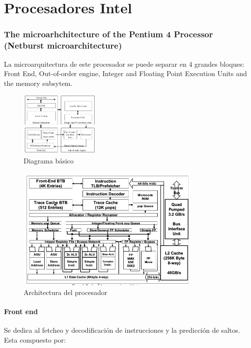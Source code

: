 \part{Procesadores Intel}
\section{The microarhchitecture of the Pentium 4 Processor (Netburst microarchitecture)}

La microarquitectura de este procesador se puede separar en 4 grandes bloques: Front End, Out-of-order engine, Integer and Floating Point Execution Units and the memory subsytem.

\begin{figure}[ht]
	\centering
	\includegraphics[width=0.35\textwidth]{imagenes/p4-block-architecture}
	\caption{Diagrama básico}
	\label{fig:p4DiagramaBasico}
\end{figure}
\begin{figure}[ht]
	\centering
	\includegraphics[width=0.8\textwidth]{imagenes/p4-architecture}
	\caption{Architectura del procesador}
	\label{fig:p4DiagramaBasico}
\end{figure}

\subsection{Front end}
Se dedica al fetcheo y decodificación de instrucciones y la predicción de saltos. Esta compuesto por:
